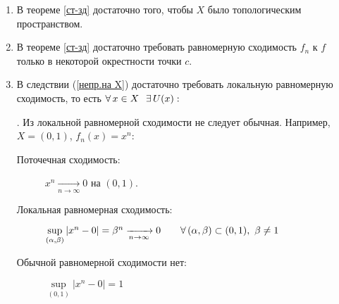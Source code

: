 \begin{zam}[https://www.youtube.com/live/oGN0SkfpZME?si=ZupIRj7L9IorPjcV&t=12462]
	\begin{enumerate}
		\item В теореме \ref{ст-зд} достаточно того, чтобы $X$ было топологическим пространством.
		
		\item В теореме \ref{ст-зд} достаточно требовать равномерную сходимость $f_n$ к $f$ только в некоторой окрестности точки $c$.
		
		\item В следствии (\ref{непр.на X}) достаточно требовать локальную равномерную сходимость, то есть $\A x \in X \E U(x) :$\!. \medskip Из локальной равномерной сходимости не следует обычная. Например, $X = (0, 1)$, $f_n(x) = x^n$: 
		\begin{description} %
		\item[\normalfont Поточечная сходимость:] $x^n \xrightarrow[n \to \infty]{} 0$ на $(0, 1)$.
		 
		\item[\normalfont Локальная равномерная сходимость:] $\sup\limits_{(\alpha, \beta)}|x^n - 0| = \beta^n \xrightarrow[n \to \infty]{} 0 \qquad \forall \, (\alpha, \beta) \subset (0, 1),\ \beta \ne 1$
		
		\item[\normalfont Обычной равномерной сходимости нет:] $\sup\limits_{(0, 1)}|x^n - 0| = 1$
		\end{description} %
	\end{enumerate} %
\end{zam}
	